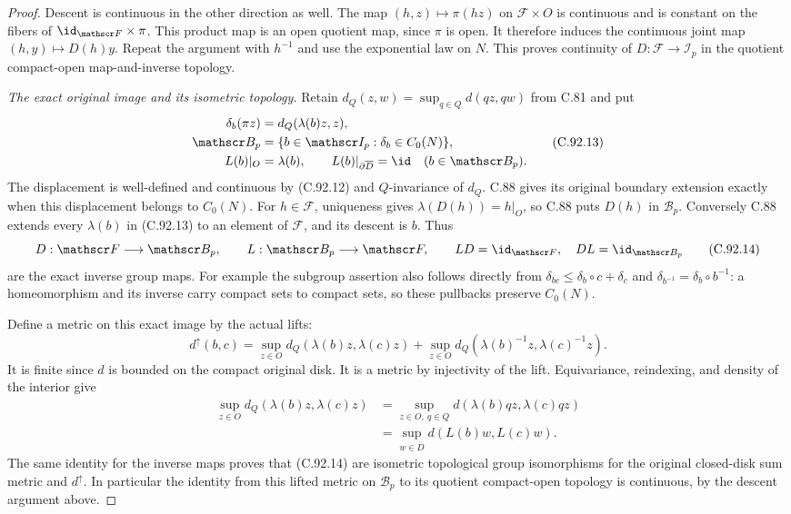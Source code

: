 \begin{proof}
Descent is continuous in the other direction as well.
The map $(h,z)\mapsto\pi(hz)$ on $\mathscr F\times O$
is continuous and is constant on the fibers of
$\id_{\mathscr F}\times\pi$. This product map is an open
quotient map, since $\pi$ is open. It therefore induces
the continuous joint map $(h,y)\mapsto D(h)y$.
Repeat the argument with $h^{-1}$ and use the exponential
law on $N$. This proves continuity of
$D:\mathscr F\to\mathscr I_p$ in the quotient compact-open
map-and-inverse topology.

\emph{The exact original image and its isometric topology.}
Retain $d_Q(z,w)=\sup_{q\in Q}d(qz,qw)$ from C.81 and put
\[
 \begin{split}
 \delta_b(\pi z)&=d_Q(\lambda(b)z,z),\\
 \mathscr B_p&=\{b\in\mathscr I_p:\delta_b\in C_0(N)\},\\
 L(b)|_O&=\lambda(b),\qquad
 L(b)|_{\partial\overline D}=\id\quad(b\in\mathscr B_p).
 \end{split}                                                   \tag{C.92.13}
\]
The displacement is well-defined and continuous by (C.92.12)
and $Q$-invariance of $d_Q$. C.88 gives its original boundary
extension exactly when this displacement belongs to $C_0(N)$.
For $h\in\mathscr F$, uniqueness gives
$\lambda(D(h))=h|_O$, so C.88 puts $D(h)$ in $\mathscr B_p$.
Conversely C.88 extends every $\lambda(b)$ in (C.92.13) to
an element of $\mathscr F$, and its descent is $b$. Thus
\[
 D:\mathscr F\longrightarrow\mathscr B_p,\qquad
 L:\mathscr B_p\longrightarrow\mathscr F,\qquad
 LD=\id_{\mathscr F},\quad DL=\id_{\mathscr B_p}
                                                               \tag{C.92.14}
\]
are the exact inverse group maps.
For example the subgroup assertion also follows directly from
$\delta_{bc}\leq\delta_b\circ c+\delta_c$ and
$\delta_{b^{-1}}=\delta_b\circ b^{-1}$: a homeomorphism and its
inverse carry compact sets to compact sets, so these pullbacks
preserve $C_0(N)$.

Define a metric on this exact image by the actual lifts:
\[
 d^\uparrow(b,c)=
 \sup_{z\in O}d_Q(\lambda(b)z,\lambda(c)z)
 +\sup_{z\in O}d_Q(\lambda(b)^{-1}z,\lambda(c)^{-1}z).
                                                               \tag{C.92.15}
\]
It is finite since $d$ is bounded on the compact original disk.
It is a metric by injectivity of the lift. Equivariance,
reindexing, and density of the interior give
\[
 \begin{split}
 \sup_{z\in O}d_Q(\lambda(b)z,\lambda(c)z)
 &=\sup_{z\in O,\ q\in Q}d(\lambda(b)qz,\lambda(c)qz)\\
 &=\sup_{w\in\overline D}d(L(b)w,L(c)w).
 \end{split}                                                   \tag{C.92.16}
\]
The same identity for the inverse maps proves that (C.92.14)
are isometric topological group isomorphisms for the original
closed-disk sum metric and $d^\uparrow$.
In particular the identity from this lifted metric on
$\mathscr B_p$ to its quotient compact-open topology is
continuous, by the descent argument above.


\end{proof}
